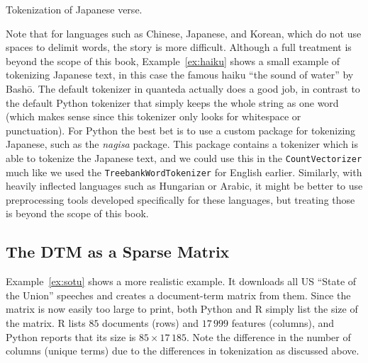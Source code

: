\begin{ccsexample}
  \begin{tcbraster}[raster columns=2,raster equal height=rows,raster valign=top]
    \begin{tcolorbox}[title=Python Output]
        \texttt{[image: \{chapter10/haiku.py]}.png}
    \end{tcolorbox}%
    \begin{tcolorbox}[title=R Output]
        \texttt{[image: \{chapter10/haiku.r]}.png}
    \end{tcolorbox}%
  \end{tcbraster}
  \caption{Tokenization of Japanese verse.}\label{ex:haiku}
\end{ccsexample}



Note that for languages such as Chinese, Japanese, and Korean, which do not use spaces to delimit words, the story is more difficult.
Although a full treatment is beyond the scope of this book, Example~\ref{ex:haiku} shows a small example of tokenizing Japanese text,
in this case the famous haiku ``the sound of water'' by Bash\={o}.
The default tokenizer in quanteda actually does a good job, in contrast to the default Python tokenizer
that simply keeps the whole string as one word
(which makes sense since this tokenizer only looks for whitespace or punctuation).
For Python the best bet is to use a custom package for tokenizing Japanese, such as the \emph{nagisa} package.
This package contains a tokenizer which is able to tokenize the Japanese text, and we could use this in the \texttt{CountVectorizer}
much like we used the \texttt{TreebankWordTokenizer} for English earlier.
Similarly, with heavily inflected languages such as Hungarian or Arabic,
it might be better to use preprocessing tools developed specifically for these languages, but treating those is
beyond the scope of this book.


\subsection{The DTM as a Sparse Matrix}\label{sec:dtm}


Example~\ref{ex:sotu} shows a more realistic example.
It downloads all US ``State of the Union'' speeches and creates a document-term matrix from them.
Since the matrix is now easily too large to print, both Python and R simply list the size of the matrix.
R lists $85$ documents (rows) and $17\,999$ features (columns), and Python reports that its size is $85\times17\,185$.
Note the difference in the number of columns (unique terms) due to the differences in tokenization as discussed above.

